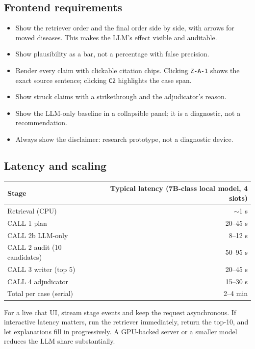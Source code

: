 \documentclass[11pt,a4paper]{article}
\newcommand{\code}[1]{\texttt{\small #1}}
\begin{document}
\subsection{Frontend requirements}

\begin{itemize}[leftmargin=1.4em]
\item Show the retriever order and the final order side by side, with arrows for
moved diseases. This makes the LLM's effect visible and auditable.
\item Show plausibility as a bar, not a percentage with false precision.
\item Render every claim with clickable citation chips. Clicking \code{Z-A-1} shows
the exact source sentence; clicking \code{C2} highlights the case span.
\item Show struck claims with a strikethrough and the adjudicator's reason.
\item Show the LLM-only baseline in a collapsible panel; it is a diagnostic, not a
recommendation.
\item Always show the disclaimer: research prototype, not a diagnostic device.
\end{itemize}

\subsection{Latency and scaling}

\begin{center}
\begin{tabular}{lr}
\toprule
Stage & Typical latency (7B-class local model, 4 slots)\\
\midrule
Retrieval (CPU) & $\sim$1 s\\
CALL 1 plan & 20--45 s\\
CALL 2b LLM-only & 8--12 s\\
CALL 2 audit (10 candidates) & 50--95 s\\
CALL 3 writer (top 5) & 20--45 s\\
CALL 4 adjudicator & 15--30 s\\
Total per case (serial) & 2--4 min\\
\bottomrule
\end{tabular}
\end{center}

For a live chat UI, stream stage events and keep the request asynchronous. If
interactive latency matters, run the retriever immediately, return the top-10, and
let explanations fill in progressively. A GPU-backed server or a smaller model
reduces the LLM share substantially.
\end{document}
